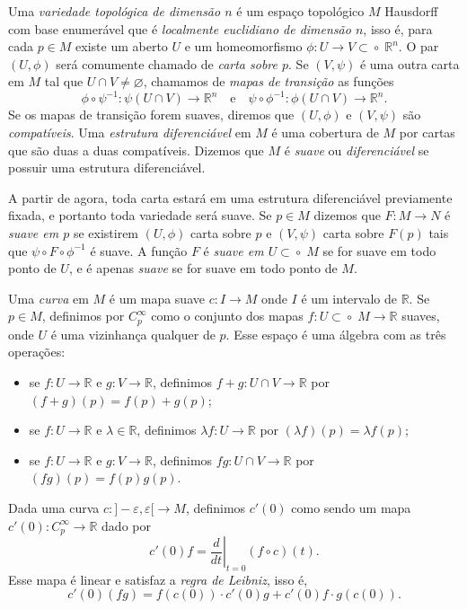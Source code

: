 \documentclass{article}
\newcommand{\openset}[0]{{\phantom{}\subset}{\circ}\phantom{.}}
\begin{document}
Uma \textit{variedade topológica de dimensão $n$} é um espaço topológico $M$ Hausdorff com base enumerável que é \textit{localmente euclidiano de dimensão $n$}, isso é, para cada $p \in M$ existe um aberto $U$ e um homeomorfismo $\phi \colon U \to V \openset \mathbb{R}^n$. O par $(U, \phi)$ será comumente chamado de \textit{carta sobre $p$}. Se $(V, \psi)$ é uma outra carta em $M$ tal que $U \cap V \neq \varnothing$, chamamos de \textit{mapas de transição} as funções \begin{equation}
    \phi \circ \psi^{-1} \colon \psi(U \cap V) \to \mathbb{R}^n \quad \text{e} \quad \psi \circ \phi^{-1} \colon \phi(U \cap V) \to \mathbb{R}^n.
\end{equation}
Se os mapas de transição forem suaves, diremos que $(U, \phi)$ e $(V, \psi)$ são \textit{compatíveis}. Uma \textit{estrutura diferenciável} em $M$ é uma cobertura de $M$ por cartas que são duas a duas compatíveis. Dizemos que $M$ é \textit{suave} ou \textit{diferenciável} se possuir uma estrutura diferenciável.

A partir de agora, toda carta estará em uma estrutura diferenciável previamente fixada, e portanto toda variedade será suave. Se $p \in M$ dizemos que $F \colon M \to N$ é \textit{suave em $p$} se existirem $(U, \phi)$ carta sobre $p$ e $(V, \psi)$ carta sobre $F(p)$ tais que $\psi \circ F \circ \phi^{-1}$ é suave. A função $F$ é \textit{suave em $U \openset M$} se for suave em todo ponto de $U$, e é apenas \textit{suave} se for suave em todo ponto de $M$.

Uma \textit{curva} em $M$ é um mapa suave $c \colon I \to M$ onde $I$ é um intervalo de $\mathbb{R}$. Se $p \in M$, definimos por $C^\infty_p$ como o conjunto dos mapas $f \colon U \openset M \to \mathbb{R}$ suaves, onde $U$ é uma vizinhança qualquer de $p$. Esse espaço é uma álgebra com as três operações: \begin{itemize}
    \item se $f \colon U \to \mathbb{R}$ e $g \colon V \to \mathbb{R}$, definimos $f + g \colon U \cap V \to \mathbb{R}$ por $(f+g)(p) = f(p) + g(p)$;
    \item se $f \colon U \to \mathbb{R}$ e $\lambda \in \mathbb{R}$, definimos $\lambda f \colon U \to \mathbb{R}$ por $(\lambda f)(p) = \lambda f(p)$;
    \item se $f \colon U \to \mathbb{R}$ e $g \colon V \to \mathbb{R}$, definimos $fg \colon U \cap V \to \mathbb{R}$ por $(fg)(p) = f(p)g(p)$.
\end{itemize}
Dada uma curva $c \colon ]-\varepsilon, \varepsilon[ \to M$, definimos $c'(0)$ como sendo um mapa $c'(0) \colon C_p^\infty \to \mathbb{R}$ dado por \begin{equation}
    c'(0)f = \left.\frac{d}{dt}\right|_{t = 0} (f \circ c)(t).
\end{equation}
Esse mapa é linear e satisfaz a \textit{regra de Leibniz}, isso é, \begin{equation}
    c'(0)(fg) = f(c(0)) \cdot c'(0)g + c'(0)f \cdot g(c(0)). 
\end{equation}
\end{document}
